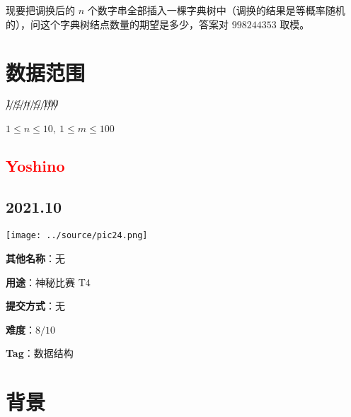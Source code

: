 \documentclass[a4paper,10pt]{article}
\begin{document}
现要把调换后的 $n$ 个数字串全部插入一棵字典树中（调换的结果是等概率随机的），问这个字典树结点数量的期望是多少，答案对 $998244353$ 取模。

\section*{数据范围}

$\xout{1\leq n\leq 100}$

$1\leq n\leq 10,\ 1\leq m\leq 100$

\newpage

\vspace*{\fill}
\begin{center}

\section{\textcolor{red}{Yoshino}}

\subsection*{2021.10}

\vspace{10pt}

\texttt{[image: ../source/pic24.png]}

\vspace{10pt}

\textbf{其他名称}：无

\vspace{10pt}

\textbf{用途}：神秘比赛 T4

\vspace{10pt}

\textbf{提交方式}：无

\vspace{10pt}

\textbf{难度}：$8/10$

\vspace{10pt}

\textbf{Tag}：数据结构

\end{center}
\vspace*{\fill}

\newpage

\section*{背景}
\end{document}
